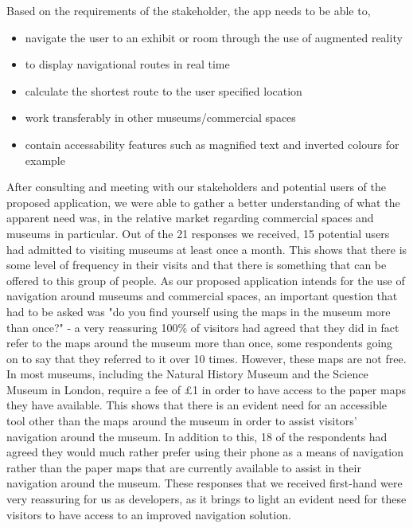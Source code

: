 Based on the requirements of the stakeholder, the app needs to be able to,

\begin{itemize}
    \item navigate the user to an exhibit or room through the use of augmented reality
    \item to display navigational routes in real time
    \item calculate the shortest route to the user specified location 
    \item work transferably in other museums/commercial spaces
    \item contain accessability features such as magnified text and inverted colours for example
\end{itemize}

After consulting and meeting with our stakeholders and potential users of the proposed application, we were able to gather a better understanding of what the apparent need was, in the relative market regarding commercial spaces and museums in particular. Out of the 21 responses we received, 15 potential users had admitted to visiting museums at least once a month. This shows that there is some level of frequency in their visits and that there is something that can be offered to this group of people. As our proposed application intends for the use of navigation around museums and commercial spaces, an important question that had to be asked was "do you find yourself using the maps in the museum more than once?" - a very reassuring 100\% of visitors had agreed that they did in fact refer to the maps around the museum more than once, some respondents going on to say that they referred to it over 10 times. However, these maps are not free. In most museums, including the Natural History Museum and the Science Museum in London, require a fee of £1 in order to have access to the paper maps they have available. This shows that there is an evident need for an accessible tool other than the maps around the museum in order to assist visitors' navigation around the museum. In addition to this, 18 of the respondents had agreed they would much rather prefer using their phone as a means of navigation rather than the paper maps that are currently available to assist in their navigation around the museum. These responses that we received first-hand were very reassuring for us as developers, as it brings to light an evident need for these visitors to have access to an improved navigation solution.